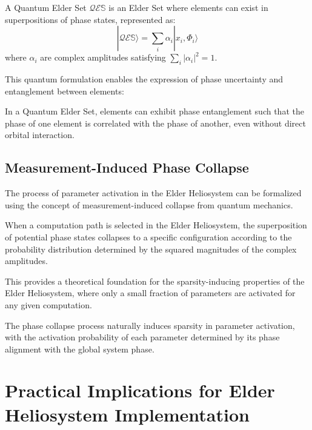 \begin{definition}
A Quantum Elder Set $\mathcal{Q}\mathcal{E}\mathbb{S}$ is an Elder Set where elements can exist in superpositions of phase states, represented as:
\begin{equation}
|\mathcal{Q}\mathcal{E}\mathbb{S}\rangle = \sum_i \alpha_i |x_i, \Phi_i\rangle
\end{equation}
where $\alpha_i$ are complex amplitudes satisfying $\sum_i |\alpha_i|^2 = 1$.
\end{definition}

This quantum formulation enables the expression of phase uncertainty and entanglement between elements:

\begin{theorem}
In a Quantum Elder Set, elements can exhibit phase entanglement such that the phase of one element is correlated with the phase of another, even without direct orbital interaction.
\end{theorem}

\subsection{Measurement-Induced Phase Collapse}

The process of parameter activation in the Elder Heliosystem can be formalized using the concept of measurement-induced collapse from quantum mechanics.

\begin{definition}
When a computation path is selected in the Elder Heliosystem, the superposition of potential phase states collapses to a specific configuration according to the probability distribution determined by the squared magnitudes of the complex amplitudes.
\end{definition}

This provides a theoretical foundation for the sparsity-inducing properties of the Elder Heliosystem, where only a small fraction of parameters are activated for any given computation.

\begin{corollary}
The phase collapse process naturally induces sparsity in parameter activation, with the activation probability of each parameter determined by its phase alignment with the global system phase.
\end{corollary}

\section{Practical Implications for Elder Heliosystem Implementation}

